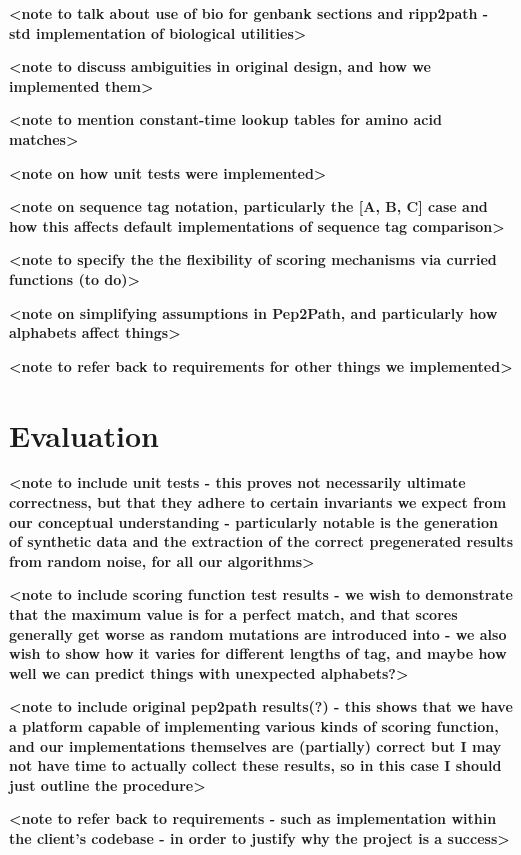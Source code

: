 \documentclass{l4proj}
\begin{document}
\textbf{<note to talk about use of bio for genbank sections and ripp2path - std implementation of biological utilities>}

\textbf{<note to discuss ambiguities in original design, and how we implemented them>}

\textbf{<note to mention constant-time lookup tables for amino acid matches>}

\textbf{<note on how unit tests were implemented>}

\textbf{<note on sequence tag notation, particularly the [A, B, C] case and how this affects default implementations of sequence tag comparison>}

\textbf{<note to specify the the flexibility of scoring mechanisms via curried functions (to do)>}

\textbf{<note on simplifying assumptions in Pep2Path, and particularly how alphabets affect things>}

\textbf{<note to refer back to requirements for other things we implemented>}

\chapter{Evaluation} 

\textbf{<note to include unit tests - this proves not necessarily ultimate correctness, but that they adhere to certain invariants we expect from our conceptual understanding - particularly notable is the generation of synthetic data and the extraction of the correct pregenerated results from random noise, for all our algorithms>}

\textbf{<note to include scoring function test results - we wish to demonstrate that the maximum value is for a perfect match, and that scores generally get worse as random mutations are introduced into - we also wish to show how it varies for different lengths of tag, and maybe how well we can predict things with unexpected alphabets?>}

\textbf{<note to include original pep2path results(?) - this shows that we have a platform capable of implementing various kinds of scoring function, and our implementations themselves are (partially) correct but I may not have time to actually collect these results, so in this case I should just outline the procedure>}

\textbf{<note to refer back to requirements - such as implementation within the client's codebase - in order to justify why the project is a success>}
\end{document}
